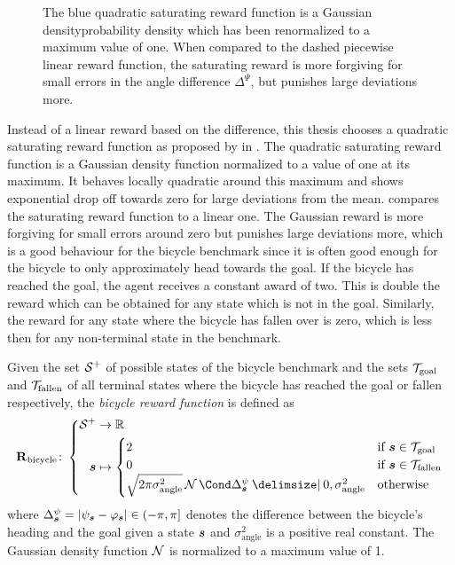 \begin{figure}[t]
    \centering
    
    \caption[Comparison of linear and saturating reward functions]{
        The blue quadratic saturating reward function is a Gaussian densityprobability density which has been renormalized to a maximum value of one.
        When compared to the dashed piecewise linear reward function, the saturating reward is more forgiving for small errors in the angle difference $\Delta^\Psi$, but punishes large deviations more.
    }
    \label{fig:saturating_reward}
\end{figure}
Instead of a linear reward based on the difference, this thesis chooses a quadratic saturating reward function as proposed by \citeauthor*{deisenroth_gaussian_2015} in \cite{deisenroth_gaussian_2015}.
The quadratic saturating reward function is a Gaussian density function normalized to a value of one at its maximum.
It behaves locally quadratic around this maximum and shows exponential drop off towards zero for large deviations from the mean.
 compares the saturating reward function to a linear one.
The Gaussian reward is more forgiving for small errors around zero but punishes large deviations more, which is a good behaviour for the bicycle benchmark since it is often good enough for the bicycle to only approximately head towards the goal.
If the bicycle has reached the goal, the agent receives a constant award of two.
This is double the reward which can be obtained for any state which is not in the goal.
Similarly, the reward for any state where the bicycle has fallen over is zero, which is less then for any non-terminal state in the benchmark.

\begin{definition}
    Given the set $\mathcal{S}^+$ of possible states of the bicycle benchmark and the sets $\mathcal{T}_{\text{goal}}$ and $\mathcal{T}_{\text{fallen}}$ of all terminal states where the bicycle has reached the goal or fallen respectively, the \emph{bicycle reward function} is defined as
    \begin{align}
        \RwdBicycle \colon \left\{
            \begin{aligned}
                \Es^+ &\to \R \\
                \mat{s} &\mapsto \begin{cases}
                    2 & \text{if $\mat{s} \in \Goal$} \\
                    0 & \text{if $\mat{s} \in \Fallen$} \\
                \sqrt{2\pi\sigma_{\text{angle}}^2}\Gaussian{\Delta^\psi_{\mat{s}} \given 0, \sigma_{\text{angle}}^2} & \text{otherwise}
                \end{cases}
            \end{aligned}
        \right.
    \end{align}
    where $\Delta^\psi_{\mat{s}} = \abs{\psi_{\mat{s}} - \varphi_{\mat{s}}} \in (-\pi, \pi]$ denotes the difference between the bicycle's heading and the goal given a state $\bm{s}$ and $\sigma_{\text{angle}}^2$ is a positive real constant.
    The Gaussian density function $\operatorname{\mathcal{N}}$ is normalized to a maximum value of 1.
\end{definition}

